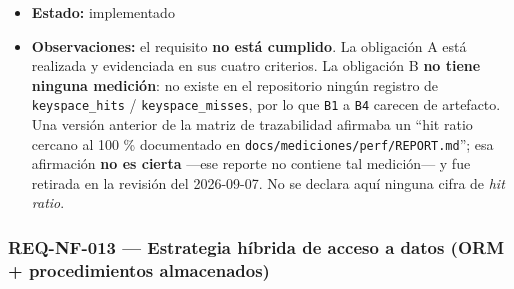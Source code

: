 \documentclass[
  spanish,
]{article}
\begin{document}
\begin{itemize}
  \texttt{.\allowbreak{}env.\allowbreak{}example} (\texttt{CACHE\_\allowbreak{}TTL\_\allowbreak{}MS}), decisión
  \texttt{docs/\allowbreak{}adr/\allowbreak{}ADR-\allowbreak{}003-\allowbreak{}jwt-\allowbreak{}redis.\allowbreak{}md}, evidencias
  \texttt{docs/\allowbreak{}mediciones/\allowbreak{}redis/} (TTL, \texttt{DBSIZE}, \texttt{KEYS},
  \texttt{maxmemory} --- que documentan la \textbf{configuración y la
  existencia} de la clave, no su tasa de aciertos), guiones de carga en
  \texttt{k6/} y reporte \texttt{docs/\allowbreak{}mediciones/\allowbreak{}perf/\allowbreak{}REPORT.\allowbreak{}md}, prueba
  \texttt{Backend/\allowbreak{}src/\allowbreak{}test/\allowbreak{}java/\allowbreak{}com/\allowbreak{}biopet/\allowbreak{}Mascota\allowbreak{}Controller\allowbreak{}Test.\allowbreak{}java};
  requisito de rendimiento dependiente REQ-NF-001; comportamiento ante
  fallo de Redis, REQ-NF-014.
\item
  \textbf{Estado:} implementado
\item
  \textbf{Observaciones:} el requisito \textbf{no está cumplido}. La
  obligación A está realizada y evidenciada en sus cuatro criterios. La
  obligación B \textbf{no tiene ninguna medición}: no existe en el
  repositorio ningún registro de \texttt{keyspace\_\allowbreak{}hits} /
  \texttt{keyspace\_\allowbreak{}misses}, por lo que \texttt{B1} a \texttt{B4}
  carecen de artefacto. Una versión anterior de la matriz de
  trazabilidad afirmaba un ``hit ratio cercano al 100 \% documentado en
  \texttt{docs/\allowbreak{}mediciones/\allowbreak{}perf/\allowbreak{}REPORT.\allowbreak{}md}''; esa afirmación \textbf{no
  es cierta} ---ese reporte no contiene tal medición--- y fue retirada
  en la revisión del 2026-09-07. No se declara aquí ninguna cifra de
  \emph{hit ratio}.
\end{itemize}

\subsubsection{REQ-NF-013 --- Estrategia híbrida de acceso a datos (ORM
+ procedimientos
almacenados)}\label{req-nf-013-estrategia-huxedbrida-de-acceso-a-datos-orm-procedimientos-almacenados}
\end{document}
